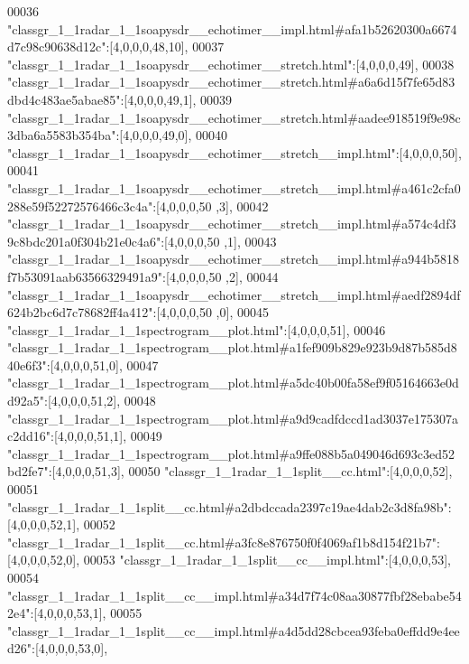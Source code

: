 \begin{DoxyCode}
00036 \textcolor{stringliteral}{"classgr\_1\_1radar\_1\_1soapysdr\_\_echotimer\_\_impl.html#afa1b52620300a6674d7c98c90638d12c"}:[4,0,0,0,48,10],
00037 \textcolor{stringliteral}{"classgr\_1\_1radar\_1\_1soapysdr\_\_echotimer\_\_stretch.html"}:[4,0,0,0,49],
00038 \textcolor{stringliteral}{"classgr\_1\_1radar\_1\_1soapysdr\_\_echotimer\_\_stretch.html#a6a6d15f7fe65d83dbd4c483ae5abae85"}:[4,0,0,0,49,1],
00039 \textcolor{stringliteral}{"classgr\_1\_1radar\_1\_1soapysdr\_\_echotimer\_\_stretch.html#aadee918519f9e98c3dba6a5583b354ba"}:[4,0,0,0,49,0],
00040 \textcolor{stringliteral}{"classgr\_1\_1radar\_1\_1soapysdr\_\_echotimer\_\_stretch\_\_impl.html"}:[4,0,0,0,50],
00041 \textcolor{stringliteral}{"classgr\_1\_1radar\_1\_1soapysdr\_\_echotimer\_\_stretch\_\_impl.html#a461c2cfa0288e59f52272576466c3c4a"}:[4,0,0,0,50
      ,3],
00042 \textcolor{stringliteral}{"classgr\_1\_1radar\_1\_1soapysdr\_\_echotimer\_\_stretch\_\_impl.html#a574c4df39c8bdc201a0f304b21e0c4a6"}:[4,0,0,0,50
      ,1],
00043 \textcolor{stringliteral}{"classgr\_1\_1radar\_1\_1soapysdr\_\_echotimer\_\_stretch\_\_impl.html#a944b5818f7b53091aab63566329491a9"}:[4,0,0,0,50
      ,2],
00044 \textcolor{stringliteral}{"classgr\_1\_1radar\_1\_1soapysdr\_\_echotimer\_\_stretch\_\_impl.html#aedf2894df624b2bc6d7c78682ff4a412"}:[4,0,0,0,50
      ,0],
00045 \textcolor{stringliteral}{"classgr\_1\_1radar\_1\_1spectrogram\_\_plot.html"}:[4,0,0,0,51],
00046 \textcolor{stringliteral}{"classgr\_1\_1radar\_1\_1spectrogram\_\_plot.html#a1fef909b829e923b9d87b585d840e6f3"}:[4,0,0,0,51,0],
00047 \textcolor{stringliteral}{"classgr\_1\_1radar\_1\_1spectrogram\_\_plot.html#a5dc40b00fa58ef9f05164663e0dd92a5"}:[4,0,0,0,51,2],
00048 \textcolor{stringliteral}{"classgr\_1\_1radar\_1\_1spectrogram\_\_plot.html#a9d9cadfdccd1ad3037e175307ac2dd16"}:[4,0,0,0,51,1],
00049 \textcolor{stringliteral}{"classgr\_1\_1radar\_1\_1spectrogram\_\_plot.html#a9ffe088b5a049046d693c3ed52bd2fe7"}:[4,0,0,0,51,3],
00050 \textcolor{stringliteral}{"classgr\_1\_1radar\_1\_1split\_\_cc.html"}:[4,0,0,0,52],
00051 \textcolor{stringliteral}{"classgr\_1\_1radar\_1\_1split\_\_cc.html#a2dbdccada2397c19ae4dab2c3d8fa98b"}:[4,0,0,0,52,1],
00052 \textcolor{stringliteral}{"classgr\_1\_1radar\_1\_1split\_\_cc.html#a3fc8e876750f0f4069af1b8d154f21b7"}:[4,0,0,0,52,0],
00053 \textcolor{stringliteral}{"classgr\_1\_1radar\_1\_1split\_\_cc\_\_impl.html"}:[4,0,0,0,53],
00054 \textcolor{stringliteral}{"classgr\_1\_1radar\_1\_1split\_\_cc\_\_impl.html#a34d7f74c08aa30877fbf28ebabe542e4"}:[4,0,0,0,53,1],
00055 \textcolor{stringliteral}{"classgr\_1\_1radar\_1\_1split\_\_cc\_\_impl.html#a4d5dd28cbcea93feba0effdd9e4eed26"}:[4,0,0,0,53,0],

\end{DoxyCode}
